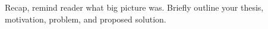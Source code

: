 
Recap, remind reader what big picture was.
Briefly outline your thesis, motivation, problem, and proposed solution.